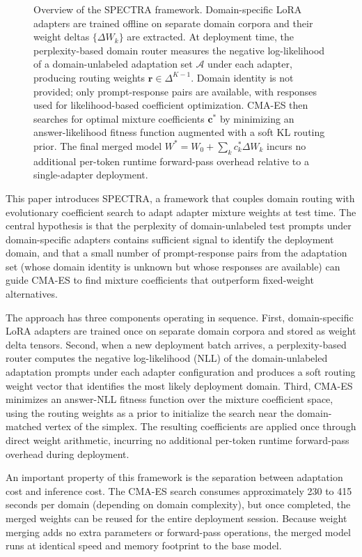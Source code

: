 \documentclass[preprint,12pt]{elsarticle}
\begin{document}
\begin{figure}[t]
{\begin{tikzpicture}
\end{tikzpicture}%
}
\caption{Overview of the SPECTRA framework. Domain-specific LoRA adapters are
trained offline on separate domain corpora and their weight deltas
$\{\Delta W_k\}$ are extracted. At deployment time, the perplexity-based
domain router measures the negative log-likelihood of a domain-unlabeled
adaptation set $\mathcal{A}$ under each adapter, producing routing weights
$\mathbf{r} \in \Delta^{K-1}$. Domain identity is not provided; only
prompt-response pairs are available, with responses used for likelihood-based
coefficient optimization. CMA-ES then searches for optimal mixture
coefficients $\mathbf{c}^*$ by minimizing an answer-likelihood fitness
function augmented with a soft KL routing prior. The final merged model
$W^* = W_0 + \sum_k c_k^* \Delta W_k$ incurs no additional per-token
runtime forward-pass overhead relative to a single-adapter deployment.}
\label{fig:overview}
\end{figure}

This paper introduces SPECTRA, a framework that couples domain routing with
evolutionary coefficient search to adapt adapter mixture weights at test time.
The central hypothesis is that the perplexity of domain-unlabeled test prompts
under domain-specific adapters contains sufficient signal to identify the
deployment domain, and that a small number of prompt-response pairs from the
adaptation set (whose domain identity is unknown but whose responses are
available) can guide CMA-ES to find mixture coefficients that outperform
fixed-weight alternatives.

The approach has three components operating in sequence. First, domain-specific
LoRA adapters are trained once on separate domain corpora and stored as weight
delta tensors. Second, when a new deployment batch arrives, a perplexity-based
router computes the negative log-likelihood (NLL) of the domain-unlabeled
adaptation prompts under each adapter configuration and produces a soft routing
weight vector that identifies the most likely deployment domain. Third, CMA-ES
minimizes an answer-NLL fitness function over the mixture coefficient space,
using the routing weights as a prior to initialize the search near the
domain-matched vertex of the simplex. The resulting coefficients are applied
once through direct weight arithmetic, incurring no additional per-token
runtime forward-pass overhead during deployment.

An important property of this framework is the separation between adaptation
cost and inference cost. The CMA-ES search consumes approximately 230 to 415
seconds per domain (depending on domain complexity), but once completed, the
merged weights can be reused for the entire deployment session. Because weight
merging adds no extra parameters or forward-pass operations, the merged model
runs at identical speed and memory footprint to the base model.
\end{document}
